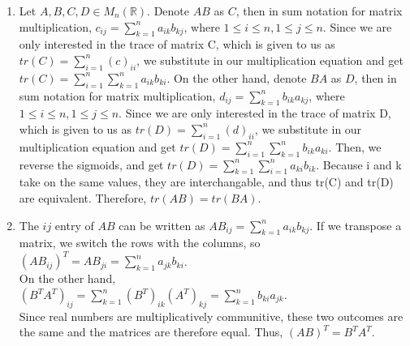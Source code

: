 \documentclass{article}
\begin{document}
\begin{enumerate}
\begin{enumerate}
\item Let $A,B,C,D \in M_n(\mathbb{R})$. Denote $AB$ as $C$, then in sum notation for matrix multiplication, $c_{ij} = \sum\limits_{k = 1}^n a_{ik}b_{kj}$, where $1 \leq i \leq n, 1 \leq j \leq n$. Since we are only interested in the trace of matrix C, which is given to us as $tr(C) = \sum\limits_{i = 1}^n (c)_{ii}$, we substitute in our multiplication equation and get
$tr(C) = \sum\limits_{i = 1}^n \sum\limits_{k = 1}^n a_{ik}b_{ki}$. On the other hand, denote $BA$ as $D$, then in sum notation for matrix multiplication, $d_{ij} =  \sum\limits_{k = 1}^n b_{ik}a_{kj}$, where $1 \leq i \leq n, 1 \leq j \leq n$. Since we are only interested in the trace of matrix D, which is given to us as $tr(D) = \sum\limits_{i = 1}^n (d)_{ii}$, we substitute in our multiplication equation and get $tr(D) = \sum\limits_{i = 1}^n \sum\limits_{k = 1}^n b_{ik}a_{ki}$. Then, we reverse the sigmoids, and get $tr(D) = \sum\limits_{k = 1}^n \sum\limits_{i = 1}^n a_{ki}b_{ik}$. Because i and k take on the same values, they are interchangable, and thus tr(C) and tr(D) are equivalent. Therefore, $tr(AB) = tr(BA)$.

\item The $ij$ entry of $AB$ can be written as $AB_{ij} = \sum\limits_{k = 1}^n a_{ik}b_{kj}$. If we transpose a matrix, we switch the rows with the columns, so\\ $(AB_{ij})^T = AB_{ji} = \sum\limits_{k = 1}^n a_{jk}b_{ki}$.\\ On the other hand, \\$(B^TA^T)_{ij} = \sum\limits_{k = 1}^n (B^T)_{ik}(A^T)_{kj} = \sum\limits_{k = 1}^n b_{ki}a_{jk}$. \\Since real numbers are multiplicatively communitive, these two outcomes are the same and the matrices are therefore equal. Thus, $(AB)^T = B^TA^T$.

\end{enumerate}

\end{enumerate}
\end{document}
